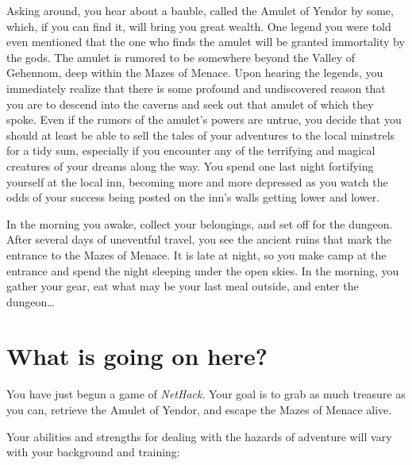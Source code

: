 Asking around, you hear about a bauble, called the Amulet of Yendor by some,
which, if you can find it, will bring you great wealth.  One legend you were
told even mentioned that the one who finds the amulet will be granted
immortality by the gods.  The amulet is rumored to be somewhere beyond the
Valley of Gehennom, deep within the Mazes of Menace.  Upon hearing the
legends, you immediately realize that there is some profound and 
undiscovered reason that you are to descend into the caverns and seek 
out that amulet of which they spoke.  Even if the rumors of the amulet's 
powers are untrue, you decide that you should at least be able to sell the 
tales of your adventures to the local minstrels for a tidy sum, especially 
if you encounter any of the terrifying and magical creatures of 
your dreams along the way.  You spend one last night fortifying yourself 
at the local inn, becoming more and more depressed as you watch the odds 
of your success being posted on the inn's walls getting lower and lower.  

\nd In the morning you awake, collect your belongings, and 
set off for the dungeon.  After several days of uneventful 
travel, you see the ancient ruins that mark the entrance to the 
Mazes of Menace.  It is late at night, so you make camp at the entrance 
and spend the night sleeping under the open skies.  In the morning, you 
gather your gear, eat what may be your last meal outside, and enter the 
dungeon\ldots

\section{What is going on here?}

You have just begun a game of {\it NetHack}.  Your goal is to grab as much
treasure as you can, retrieve the Amulet of Yendor, and escape the
Mazes of Menace alive.  

Your abilities and strengths for dealing with the hazards of adventure
will vary with your background and training:

